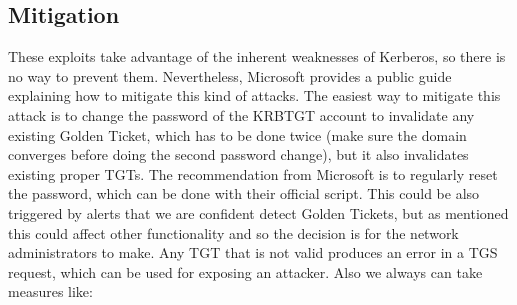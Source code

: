 \subsection{Mitigation}
These exploits take advantage of the inherent weaknesses of Kerberos, so there is no way to prevent them. Nevertheless, Microsoft provides a public guide explaining how to mitigate this kind of attacks\cite{microsoft_mitigation}.
The easiest way to mitigate this attack is to change the password of the KRBTGT account to invalidate any existing Golden Ticket, which has to be done twice (make sure the domain converges before doing the second password change\cite{hood}), but it also invalidates existing proper TGTs.
\linej
The recommendation from Microsoft is to regularly reset the password\cite{tarlogic_comprehension}\cite{adsecurity_483}, which can be done with their official script\cite{reset_script}. This could be also triggered by alerts that we are confident detect Golden Tickets, but as mentioned this could affect other functionality and so the decision is for the network administrators to make. Any TGT that is not valid produces an error in a TGS request, which can be used for exposing an attacker\cite{scom_GT}.
\linej
\linej
Also we always can take measures like:
